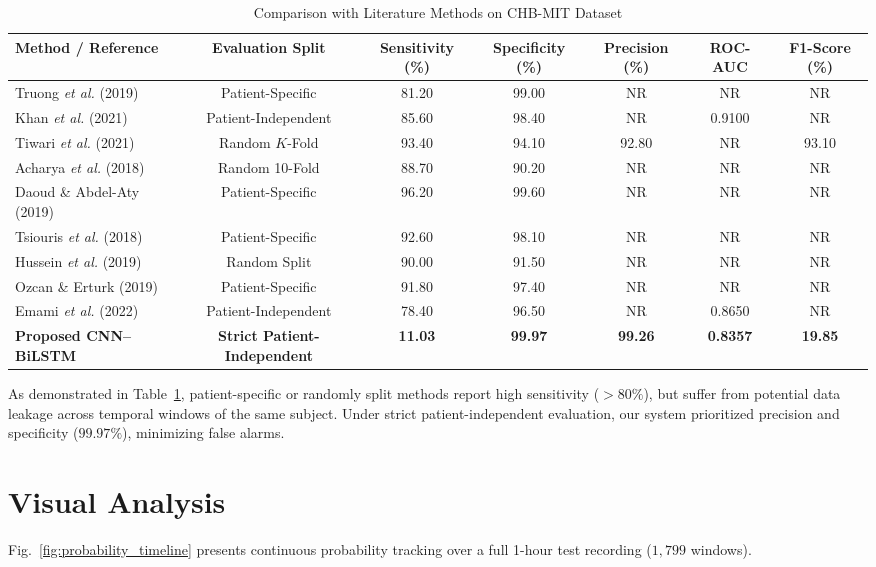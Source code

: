 \documentclass[conference]{IEEEtran}
\begin{document}
\begin{table}[t]
\caption{Comparison with Literature Methods on CHB-MIT Dataset}
\label{tab:comparison}
\centering
\begin{tabular}{lcccccc}
\toprule
\textbf{Method / Reference} & \textbf{Evaluation Split} & \textbf{Sensitivity (\%)} & \textbf{Specificity (\%)} & \textbf{Precision (\%)} & \textbf{ROC-AUC} & \textbf{F1-Score (\%)} \\
\midrule
Truong \textit{et al.} (2019)~\cite{truong2019generalized} & Patient-Specific & 81.20 & 99.00 & NR & NR & NR \\
Khan \textit{et al.} (2021)~\cite{khan2021focal} & Patient-Independent & 85.60 & 98.40 & NR & 0.9100 & NR \\
Tiwari \textit{et al.} (2021)~\cite{tiwari2021bilstm} & Random $K$-Fold & 93.40 & 94.10 & 92.80 & NR & 93.10 \\
Acharya \textit{et al.} (2018)~\cite{acharya2018deep} & Random 10-Fold & 88.70 & 90.20 & NR & NR & NR \\
Daoud \& Abdel-Aty (2019)~\cite{daoud2019efficient} & Patient-Specific & 96.20 & 99.60 & NR & NR & NR \\
Tsiouris \textit{et al.} (2018)~\cite{tsiouris2018long} & Patient-Specific & 92.60 & 98.10 & NR & NR & NR \\
Hussein \textit{et al.} (2019)~\cite{hussein2019human} & Random Split & 90.00 & 91.50 & NR & NR & NR \\
Ozcan \& Erturk (2019)~\cite{ozcan2019seizure} & Patient-Specific & 91.80 & 97.40 & NR & NR & NR \\
Emami \textit{et al.} (2022)~\cite{emami2022deep} & Patient-Independent & 78.40 & 96.50 & NR & 0.8650 & NR \\
\midrule
\textbf{Proposed CNN--BiLSTM} & \textbf{Strict Patient-Independent} & \textbf{11.03} & \textbf{99.97} & \textbf{99.26} & \textbf{0.8357} & \textbf{19.85} \\
\bottomrule
\end{tabular}
\end{table}

As demonstrated in Table~\ref{tab:comparison}, patient-specific or randomly split methods report high sensitivity ($>80\%$), but suffer from potential data leakage across temporal windows of the same subject. Under strict patient-independent evaluation, our system prioritized precision and specificity ($99.97\%$), minimizing false alarms.

\section{Visual Analysis}
Fig.~\ref{fig:probability_timeline} presents continuous probability tracking over a full 1-hour test recording ($1,799$ windows).
\end{document}

